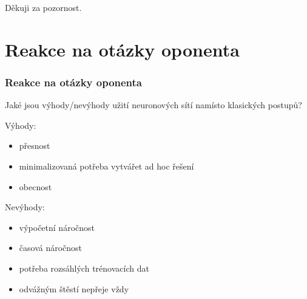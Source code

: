 \documentclass{beamer}
\begin{document}

\begin{frame}

\Huge{\centerline{Děkuji za pozornost.}}

\end{frame}


\section{Reakce na otázky oponenta}

\begin{frame}

\frametitle{Reakce na otázky oponenta}

Jaké jsou výhody/nevýhody užití neuronových sítí namísto klasických postupů?

\begin{center}
	\noindent\makebox[\linewidth]{\rule{0.9\textwidth}{0.4pt}}
\end{center}

\bigskip

Výhody:
\begin{itemize}
	\item<2-> přesnost
	\item<3-> minimalizovaná potřeba vytvářet ad hoc řešení
	\item<4-> obecnost
\end{itemize}

Nevýhody:
\begin{itemize}
	\item<5-> výpočetní náročnost
	\item<6-> časová náročnost
	\item<7-> potřeba rozsáhlých trénovacích dat
	\item<8-> odvážným štěstí nepřeje vždy
\end{itemize}

\end{frame}

\end{document}
